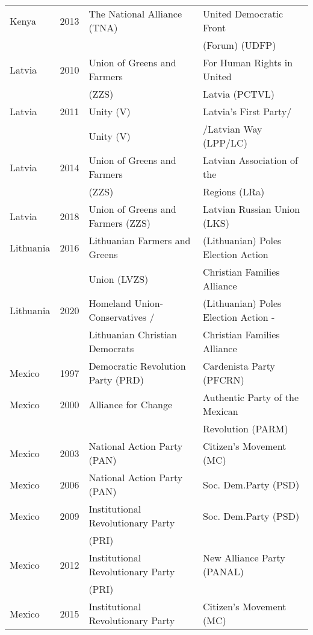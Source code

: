 {\begin{longtable}{|l|c|l|l|}
  Kenya & 2013 &   The National Alliance (TNA) &   United Democratic Front   \\ 
         &      &    &    (Forum) (UDFP) \\ 
  Latvia & 2010 &   Union of Greens and Farmers     &   For Human Rights in United   \\ 
          &   &     (ZZS)   &    Latvia (PCTVL) \\ 
  Latvia & 2011 &   Unity (V) &   Latvia's First Party/   \\ 
         &      &   Unity (V) &    /Latvian Way (LPP/LC)   \\ 
  Latvia & 2014 &   Union of Greens and Farmers    &   Latvian Association of the  \\ 
         &   &     (ZZS)   &     Regions (LRa) \\
  Latvia & 2018 &   Union of Greens and Farmers (ZZS)   &   Latvian Russian Union (LKS)   \\ 
  Lithuania & 2016 &   Lithuanian Farmers and Greens  &   (Lithuanian) Poles Election Action  \\ 
         &  &    Union (LVZS) &    Christian Families Alliance  \\ 
  Lithuania & 2020 &   Homeland Union-Conservatives /  &   (Lithuanian) Poles Election Action -   \\ 
    &  &     Lithuanian Christian Democrats &    Christian Families Alliance  \\ 
  Mexico & 1997 &   Democratic Revolution Party (PRD) &   Cardenista Party (PFCRN) \\ 
  Mexico & 2000 &   Alliance for Change   &   Authentic Party of the Mexican  \\ 
               &      &         &  Revolution (PARM)   \\ 
  Mexico & 2003 &   National Action Party (PAN) &   Citizen's Movement (MC)   \\ 
  Mexico & 2006 &   National Action Party (PAN) &        Soc. Dem.Party (PSD)   \\ 
  Mexico & 2009 &   Institutional Revolutionary Party &        Soc. Dem.Party (PSD)   \\ 
               &      &        (PRI)  &     \\ 
  Mexico & 2012 &   Institutional Revolutionary Party &   New Alliance Party (PANAL) \\ 
               &      &        (PRI)  &     \\ 
  Mexico & 2015 &   Institutional Revolutionary Party  &   Citizen's Movement (MC)   \\ 

\end{longtable}}
